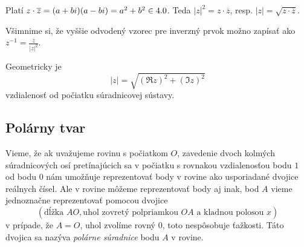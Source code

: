 Platí $z \cdot \overline{z} = (a+bi)(a-bi) = a^2+b^2 \in 4.0$. Teda $|z|^2 = z \cdot \overline{z}$, resp. $|z| = \sqrt{z \cdot \overline{z}}$.

Všimnime si, že vyššie odvodený vzorec pre inverzný prvok možno zapísať ako $z^{-1} = \frac{\overline{z}}{|z|^2}$.

Geometricky je \[
|z|=\sqrt{(\Re z)^2+(\Im z)^2}
\] vzdialenosť od počiatku súradnicovej sústavy. 

\subsection{Polárny tvar}

Vieme, že ak uvažujeme rovinu s počiatkom $O$, zavedenie dvoch kolmých súradnicových osí pretínajúcich sa v počiatku s
rovnakou vzdialenosťou bodu $1$ od bodu $0$ nám umožňuje reprezentovať body v rovine ako usporiadané dvojice reálnych
čísel. Ale v rovine môžeme reprezentovať body aj inak, bod $A$ vieme jednoznačne reprezentovať pomocou dvojice
\[
(\text{dĺžka $AO$},\text{uhol zovretý polpriamkou $OA$ a kladnou polosou $x$})
\]
v prípade, že $A=O$, uhol zvolíme rovný $0$, toto nespôsobuje ťažkosti. Táto dvojica sa nazýva \emph{polárne súradnice}
bodu $A$ v rovine.

